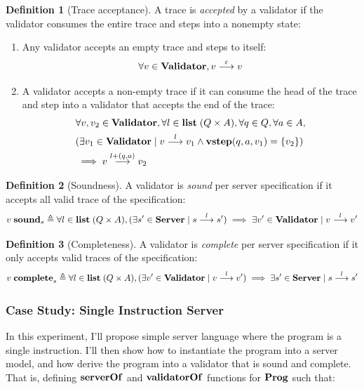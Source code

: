\documentclass{article}
\theoremstyle{definition}
\newtheorem{definition}{Definition}
\newcommand{\Server}{\ottkw{Server}}
\newcommand{\Validator}{\ottkw{Validator}}
\newcommand{\vstep}{\ottkw{vstep}}
\newcommand{\Some}[1]{\{#1\}}
\newcommand{\List}{\ottkw{list}\;}
\newcommand{\nil}{\varepsilon}
\newcommand{\yields}[3]{#1\overset{#2}{\longrightarrow}#3}
\newcommand{\accepts}[3]{#1\overset{#2}{\longrightarrow}#3}
\newcommand{\sound}{\ottkw{sound}}
\newcommand{\issound}[2]{#1\;\sound_{#2}}
\newcommand{\complete}{\ottkw{complete}}
\newcommand{\iscomplete}[2]{#1\;\complete_{#2}}
\newcommand{\Prog}{\ottkw{Prog}}
\newcommand{\serverOf}{\ottkw{serverOf}}
\newcommand{\validatorOf}{\ottkw{validatorOf}}
\begin{document}
\begin{definition}[Trace acceptance]
  A trace is {\em accepted} by a validator if the validator consumes the entire
  trace and steps into a nonempty state:
  \begin{enumerate}
  \item Any validator accepts an empty trace and steps to itself:
    \[ \forall v\in\Validator,\accepts{v}{\nil}{v} \]
  \item A validator accepts a non-empty trace if it can consume the head of the
    trace and step into a validator that accepts the end of the trace:
    \begin{align*}
      &\forall v,v_2\in\Validator,\forall
      l\in\List(Q\times A),\forall q\in Q, \forall a\in A, \\
      & (\exists v_1\in\Validator\mid\accepts{v}{l}{v_1}\wedge
      \vstep(q,a,v_1)=\Some{v_2}) \\ &\implies
      \accepts{v}{l+(q,a)}{v_2}
    \end{align*}
  \end{enumerate}
\end{definition}

\begin{definition}[Soundness]
  A validator is {\em sound} per server specification if it accepts all valid
  trace of the specification:
  \[ \issound{v}{s}\triangleq\forall l\in\List(Q\times A),(\exists s'\in\Server\mid\yields{s}{l}{s'})\implies\exists v'\in\Validator\mid\accepts{v}{l}{v'} \]
\end{definition}

\begin{definition}[Completeness]
  A validator is {\em complete} per server specification if it only accepts valid
  traces of the specification:
  \[ \iscomplete{v}{s}\triangleq\forall l\in \List(Q\times A),(\exists{v'}\in\Validator\mid\accepts{v}{l}{v'})\implies\exists{s'}\in\Server\mid\yields{s}{l}{s'} \]
\end{definition}

\subsubsection{Case Study: Single Instruction Server}

In this experiment, I'll propose simple server language where the program is a
single instruction.  I'll then show how to instantiate the program into a server
model, and how derive the program into a validator that is sound and complete.
That is, defining $\serverOf$ and $\validatorOf$ functions for $\Prog$ such
that:
\end{document}
